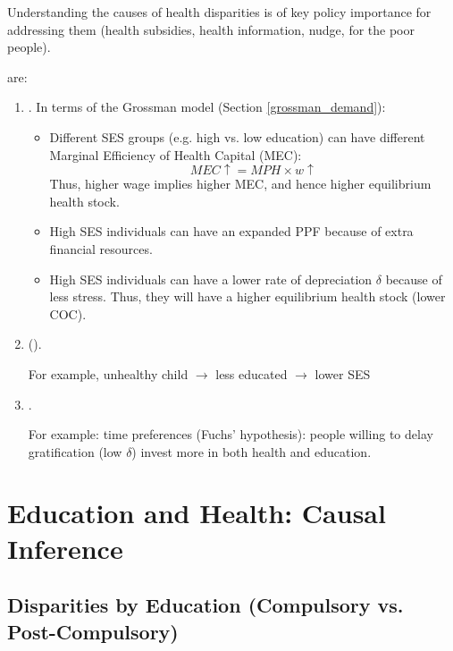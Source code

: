        Understanding the causes of health disparities is of key policy importance for addressing them (health subsidies, health information, nudge, for the poor people).
        
         are:
        \begin{enumerate}
            \item {}. In terms of the Grossman model (Section \ref{grossman_demand}):
            \begin{itemize}
                \item Different SES groups (e.g. high vs. low education) can have different Marginal Efficiency of Health Capital (MEC):
                $$MEC\uparrow=MPH\times w\uparrow$$
                Thus, higher wage implies higher MEC, and hence higher equilibrium health stock.
                \item High SES individuals can have an expanded PPF because of extra financial resources.
                \item High SES individuals can have a lower rate of depreciation $\delta$ because of less stress. Thus, they will have a higher equilibrium health stock (lower COC).
            \end{itemize}
            \item {} ().
            
            For example, unhealthy child $\to$ less educated $\to$ lower SES
            
            \item {}.
            
            For example: time preferences (Fuchs’ hypothesis): people willing to delay gratification (low $\delta$) invest more in both health and education.
        \end{enumerate}

\section{Education and Health: Causal Inference}

    \subsection{Disparities by Education (Compulsory vs. Post-Compulsory)}
    

